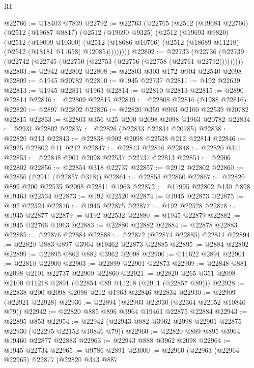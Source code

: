 \begin{lexlean}{R1}
\begin{coremodule}
@22766 := @18403 @7839
@22792 := @22763
    (@22765
      (@2512
        (@19684 @22766)
        (@2512
          (@19687 @8817)
          (@2512
            (@19690 @9325)
            (@2512
              (@19693 @9820)
              (@2512
                (@19009 @10300)
                (@2512 (@18686 @10766) (@2512 (@18689 @11218) (@2512 (@18181 @11658) @12085)))))))))
@22802 := @22733
    (@22736 (@22739 (@22742 (@22745 (@22750 (@22753 (@22756 (@22758 (@22761 @22792)))))))))
@22803 := @2942 @22802
@22808 := @22803 @303 @172 @904 @22540 @2098
@22809 := @1945 @20782
@22810 := @1945 @22737
@22811 := @192 @22639
@22813 := @1945 @22811 @1963
@22814 := @22810 @22813
@22815 := @2890 @22814
@22816 := @22809 @22815
@22819 := @22808 @22816 (@1988 @22816)
@22820 := @2897 @22802
@22826 := @22820 @359 @903 @2100 @22539 @20782 @22815
@22833 := @22803 @356 @25 @200 @2098 @2098 @1963 @20782
@22834 := @2931 @22802
@22837 := @22826 (@22833 @22834 @20785)
@22838 := @22820 @213
@22843 := @22838 @902 @2098 @22538 @212 @22814
@22846 := @2925 @22802 @11 @212
@22847 := @22843 @22846
@22848 := @22820 @341
@22853 := @22848 @901 @2098 @22537 @22737 @22813
@22854 := @2906 @22802
@22856 := @22854 @318 @22737
@22857 := @2912 @22802
@22860 := @22856 (@2911 (@22857 @318))
@22861 := @22853 @22860
@22867 := @22820 @899 @200 @22535 @2098 @22811 @1963
@22872 := @17995 @22802 @130 @898 @19463 @22534
@22873 := @192 @22520
@22874 := @1945 @22873
@22875 := @192 @22524
@22876 := @1945 @22875
@22877 := @192 @22528
@22878 := @1945 @22877
@22879 := @192 @22532
@22880 := @1945 @22879
@22882 := @1945 @22766 @1963
@22883 := @22880 @22882
@22884 := @22878 @22883
@22885 := @22876 @22884
@22888 := @22872 (@22874 @22885) @22811
@22894 := @22820 @883 @897 @3964 @19462 @22873 @22885
@22895 := @2884 @22802
@22899 := @22895 @862 @882 @3962 @2098
@22900 := @11622 @2891
@22901 := @22810 @22900
@22903 := @22899 @22901 @22873
@22909 := @22848 @881 @2098 @2101 @22737 @22900 @22860
@22921 := @22820 @265 @351 @2098 @2100 @11218 @2891 (@22854 @89 @11218 (@2911 (@22857 @89)))
@22928 := @22838 @200 @2098 @2098 @212 @1963 @22846 @22834
@22930 := @22909 (@22921 @22928)
@22936 := @22894 (@22903 @22930 (@22364 @22152 @10846 @79))
@22942 := @22820 @885 @896 @3964 @19461 @22875 @22884
@22943 := @22895 @853
@22954 := @22942 (@22943 @882 @3962 @2098 @22901 @22875 @22930 (@22295 @22152 @10846 @79))
@22960 := @22820 @889 @895 @3964 @19460 @22877 @22883
@22963 := @22943 @888 @3962 @2098
@22964 := @1945 @22734
@22965 := @9786 @2891
@23000 := @22960
    (@22963
      (@22964 @22965)
      @22877
      (@22820
        @343
        @887

\end{coremodule}
\end{lexlean}
